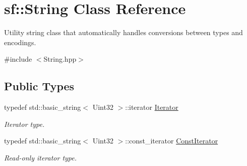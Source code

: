 \hypertarget{classsf_1_1_string}{}\section{sf\+:\+:String Class Reference}
\label{classsf_1_1_string}


Utility string class that automatically handles conversions between types and encodings.  




{\ttfamily \#include $<$String.\+hpp$>$}

\subsection*{Public Types}
\begin{DoxyCompactItemize}
\item 
\mbox{\label{classsf_1_1_string_ac90f2b7b28f703020f8d027e98806235}} 
typedef std\+::basic\+\_\+string$<$ Uint32 $>$\+::iterator \hyperlink{classsf_1_1_string_ac90f2b7b28f703020f8d027e98806235}{Iterator}
\begin{DoxyCompactList}\small\item\em Iterator type. \end{DoxyCompactList}\item 
\mbox{\label{classsf_1_1_string_a8e18efc2e8464f6eb82818902d527efa}} 
typedef std\+::basic\+\_\+string$<$ Uint32 $>$\+::const\+\_\+iterator \hyperlink{classsf_1_1_string_a8e18efc2e8464f6eb82818902d527efa}{Const\+Iterator}
\begin{DoxyCompactList}\small\item\em Read-\/only iterator type. \end{DoxyCompactList}\end{DoxyCompactItemize}
